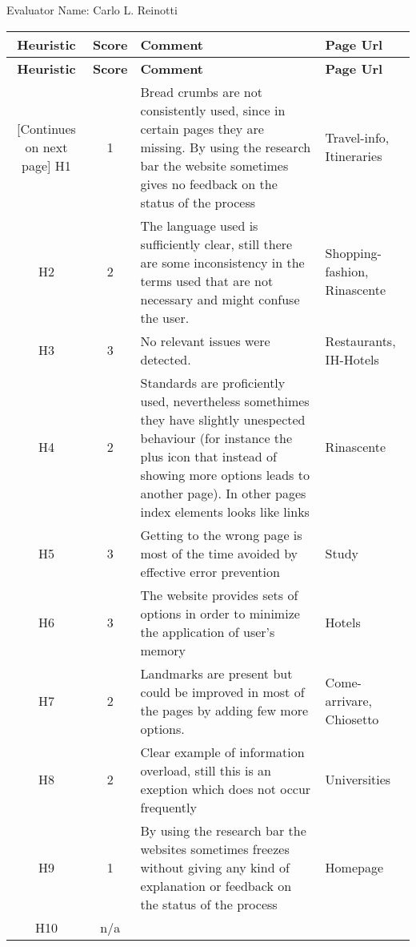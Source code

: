 Evaluator Name: Carlo L. Reinotti
\begin{tabularx}{\linewidth}{c c X p{3cm}}
    \textbf{Heuristic} & \textbf{Score} & \textbf{Comment} & \textbf{Page Url}
    \\ \midrule
    \endfirsthead
    \toprule
    \textbf{Heuristic} & \textbf{Score} & \textbf{Comment} & \textbf{Page Url}
    \\ \midrule
    \endhead
    \midrule
    \footnotesize [Continues on next page]
    \endfoot
    \bottomrule
    \endlastfoot
    H1 & 1 & Bread crumbs are not consistently used, since in certain pages they are missing. By using the research bar the website sometimes gives no feedback on the status of the process & Travel-info, Itineraries\\ \midrule
    H2 & 2 & The language used is sufficiently clear, still there are some inconsistency in the terms used that are not necessary and might confuse the user. & Shopping-fashion, Rinascente \\ \midrule
    H3 & 3 & No relevant issues were detected. & Restaurants, IH-Hotels\\ \midrule
    H4 & 2 & Standards are proficiently used, nevertheless somethimes they have slightly unespected behaviour (for instance the plus icon that instead of showing more options leads to another page). In other pages index elements looks like links & Rinascente \\ \midrule
    H5 & 3 & Getting to the wrong page is most of the time avoided by effective error prevention & Study\\ \midrule
    H6 & 3 & The website provides sets of options in order to minimize the application of user's memory & Hotels\\ \midrule
    H7 & 2 & Landmarks are present but could be improved in most of the pages by adding few more options. & Come-arrivare, Chiosetto\\ \midrule
    H8 & 2 & Clear example of information overload, still this is an exeption which does not occur frequently & Universities\\ \midrule
    H9 & 1 & By using the research bar the websites sometimes freezes without giving any kind of explanation or feedback on the status of the process & Homepage\\ \midrule
    H10 & n/a & &
\end{tabularx}
    
